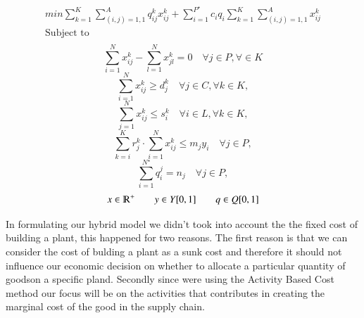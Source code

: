 \documentclass{article}
\begin{document}
\begin{equation*}
\begin{aligned}
	min \sum_{k=1}^{K} \sum_{(i,j)=1,1}^{A} q_{ij}^{k}x_{ij}^{k} + \sum_{i=1}^{P^\star} c_i q_i \sum_{k=1}^{K} \sum_{(i,j)=1,1}^{A}x_{ij}^{k} 
\\
  \text{Subject to}
\\
\end{aligned}
\end{equation*}
\begin{equation}
  \sum_{i=1}^{N} x_{ij}^k - \sum_{l=1}^{N} x_{jl}^k = 0 \quad \forall j \in P, \forall \in K
\end{equation}
\begin{equation}
  \sum_{i=1}^{N} x_{ij}^k \geq d_{j}^k \quad \forall j \in C, \forall k \in K,
\end{equation}
\begin{equation}
  \sum_{j=1}^{N} x_{ij}^{k} \leq s_{i}^{k}  \quad \forall i \in L, \forall k \in K,
\end{equation}
\begin{equation}
	\sum_{k=i}^{K} r_{j}^k \cdot \sum_{i=1}^{N}x_{ij}^k \leq m_j y_i \quad \forall j \in P,
\end{equation}
\begin{equation}
\sum_{i=1}^{N^\star} q_{i}^j = n_j \quad \forall j \in P,
\end{equation}
\begin{equation}
  x \in \varmathbb{R}^+ \quad \quad 
  y \in Y[0,1] \quad \quad  q \in Q[0,1]
\end{equation}

In formulating our hybrid model we didn't took into account the the fixed cost of building a plant, this happened for two reasons. The first reason is that we can consider the cost of bulding a plant as a sunk cost and therefore it should not influence our economic decision on whether to allocate a particular quantity of goodson a specific pland. Secondly since were using the Activity Based Cost method our focus will be on the activities that contributes in creating the marginal cost of the good in the supply chain. 
\end{document}
